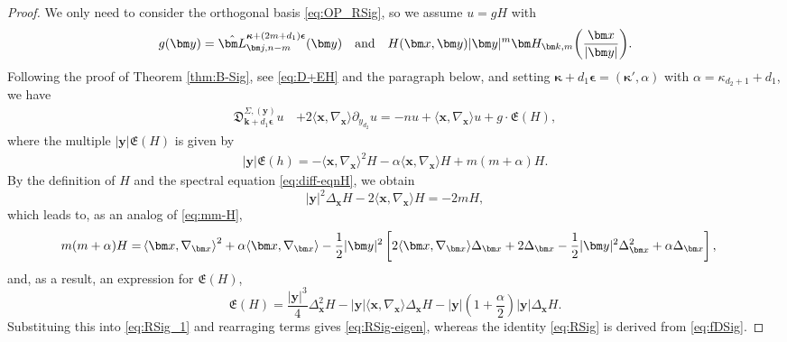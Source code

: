 \documentclass{amsart}
\theoremstyle{remark}
\def\la{{\langle}}
\def\ra{{\rangle}}
\def\fD{{\mathfrak D}}
\def\fE{{\mathfrak E}}
\def\a{{\alpha}}
\def\k{{\kappa}}
\def\la{{\langle}}
\def\ra{{\rangle}}
\def\kb{{\bm k}}
\def\xb{{\bm x}}
\def\yb{{\bm y}}
\def\Lb{{\bm L}}
\def\bep{{\boldsymbol{\epsilon}}}
\def\bk{{\boldsymbol{\kappa}}}
\begin{document}
\begin{proof}
We only need to consider the orthogonal basis \eqref{eq:OP_RSig}, so we assume $u  = g H$ with
$$
  g(\yb) = \hat \Lb_{\bm j, n-m}^{\bk+(2m+d_1) \bep}(\bm y) \quad \hbox{and} \quad H(\xb,\yb) |\bm y|^m   
      \bm H_{\bm k, m}  \bigg(\frac{\bm x}{|\bm y|} \bigg).
$$
Following the proof of Theorem \ref{thm:B-Sig}, see \eqref{eq:D+EH} and the paragraph below, and
setting $\bk+d_1 \bep = (\bk', \a)$ with $\a = \k_{d_2+1} + d_1$, we have
\begin{align}\label{eq:RSig_1}
  \fD_{\kb+ d_1\bep}^{\Sigma, (\yb)} u  \, & + 2 \la \xb,\nabla_\xb\ra \partial_{y_{d_2}} u = 
   -n u + \la \xb,\nabla_{\xb} \ra u + g \cdot \fE(H), 
\end{align}
where the multiple $|\yb| \fE(H)$ is given by 
\begin{align*}
|\yb| \fE(h) =  - \la \xb,\nabla_\xb\ra^2 H -  \a \la \xb,\nabla_\xb\ra H + m (m+ \a) H.
\end{align*}
By the definition of $H$ and the spectral equation \eqref{eq:diff-eqnH}, we obtain
\begin{equation*} %
    |\yb|^2 \Delta_\xb H - 2 \la \xb, \nabla_\xb \ra H = - 2 m H,
\end{equation*}
which leads to, as an analog of \eqref{eq:mm-H}, 
\begin{align*}%
    m(m+ \a) H  = \,&  \la \xb, \nabla_\xb \ra^2 + \a \la \xb, \nabla_\xb \ra 
    - \frac12 |\yb|^2 \left[ 2 \la \xb, \nabla_\xb \ra \Delta_\xb +2 \Delta_\xb - \frac 12 |\yb|^2 \Delta_\xb^2 + \a \Delta_\xb \right], \notag
\end{align*} 
and, as a result, an expression for $\fE(H)$, 
$$
   \fE(H) =  \frac{|\yb|^3}{4} \Delta_\xb^2 H -| \yb|  \la \xb, \nabla_\xb \ra \Delta_\xb H -|\yb| \left(1+ \frac{\a}{2}\right) |\yb| \Delta_\xb H. 
$$
Substituing this into \eqref{eq:RSig_1} and rearraging terms gives \eqref{eq:RSig-eigen}, whereas the identity
\eqref{eq:RSig} is derived from \eqref{eq:fDSig}. 
\end{proof}
\end{document}
